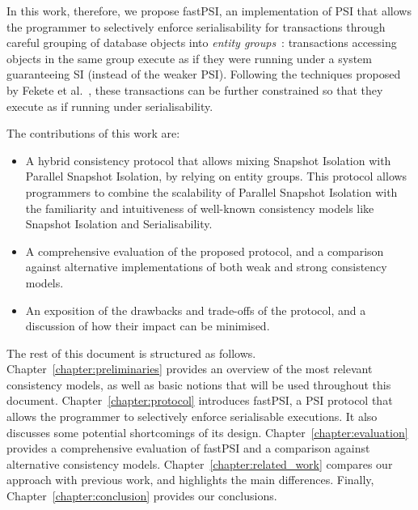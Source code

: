 In this work, therefore, we propose fastPSI, an implementation of PSI that allows the programmer to selectively enforce serialisability for transactions through careful grouping of database objects into \emph{entity groups}~\citep{baker_megastore}: transactions accessing objects in the same group execute as if they were running under a system guaranteeing SI (instead of the weaker PSI). Following the techniques proposed by Fekete et al.~\citep{fekete_ssi}, these transactions can be further constrained so that they execute as if running under serialisability.

\pagebreak

The contributions of this work are:

\begin{itemize}
    \item A hybrid consistency protocol that allows mixing Snapshot Isolation with Parallel Snapshot Isolation, by relying on entity groups. This protocol allows programmers to combine the scalability of Parallel Snapshot Isolation with the familiarity and intuitiveness of well-known consistency models like Snapshot Isolation and Serialisability.
    \item A comprehensive evaluation of the proposed protocol, and a comparison against alternative implementations of both weak and strong consistency models.
    \item An exposition of the drawbacks and trade-offs of the protocol, and a discussion of how their impact can be minimised.
\end{itemize}


The rest of this document is structured as follows. Chapter~\ref{chapter:preliminaries} provides an overview of the most relevant consistency models, as well as basic notions that will be used throughout this document. Chapter~\ref{chapter:protocol} introduces fastPSI, a PSI protocol that allows the programmer to selectively enforce serialisable executions. It also discusses some potential shortcomings of its design. Chapter~\ref{chapter:evaluation} provides a comprehensive evaluation of fastPSI and a comparison against alternative consistency models. Chapter~\ref{chapter:related_work} compares our approach with previous work, and highlights the main differences. Finally, Chapter~\ref{chapter:conclusion} provides our conclusions.
